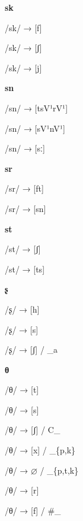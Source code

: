 \begin{center}\textbf{sk}\end{center}
\begin{multicols}{4}
\noindent /sk/ → [f]

\noindent /sk/ → [ʃ]

\noindent /sk/ → [j]
\end{multicols}


\begin{center}\textbf{sn}\end{center}
\begin{multicols}{4}
\noindent /sn/ → [tsV¹rV¹]

\noindent /sn/ → [sV¹nV¹]

\noindent /sn/ → [sː]
\end{multicols}


\begin{center}\textbf{sr}\end{center}
\begin{multicols}{4}
\noindent /sr/ → [ft]

\noindent /sr/ → [sn]
\end{multicols}


\begin{center}\textbf{st}\end{center}
\begin{multicols}{4}
\noindent /st/ → [ʃ]

\noindent /st/ → [ts]
\end{multicols}


\begin{center}\textbf{ʂ}\end{center}
\begin{multicols}{4}
\noindent /ʂ/ → [h]

\noindent /ʂ/ → [s]

\noindent /ʂ/ → [ʃ] / \_a
\end{multicols}


\begin{center}\textbf{θ}\end{center}
\begin{multicols}{4}
\noindent /θ/ → [t]

\noindent /θ/ → [s]

\noindent /θ/ → [ʃ] / C\_

\noindent /θ/ → [x] / \_\{p,k\}

\noindent /θ/ → $\varnothing$ / \_\{p,t,k\}

\noindent /θ/ → [r]

\noindent /θ/ → [f] / \#\_
\end{multicols}


